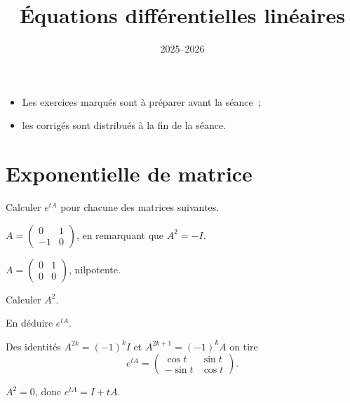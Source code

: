 \documentclass[11pt]{ocots-td}
\title{Équations différentielles linéaires}
\date{2025--2026}
\begin{document}
\maketitle

\begin{instructions}\breakline%
    \begin{itemize}
        \item Les exercices marqués \handwrite{} sont à préparer avant la séance~;
        \item les corrigés sont distribués à la fin de la séance.
    \end{itemize}
\end{instructions}

\medskip
\section{Exponentielle de matrice}


\begin{exercise}[label=ex:expo]
    Calculer $e^{tA}$ pour chacune des matrices suivantes.
    \begin{question}
        $A = \begin{pmatrix} 0 & 1 \\ -1 & 0 \end{pmatrix}$, en remarquant que
        $A^2 = -I$.
    \end{question}
    \begin{question}
        $A = \begin{pmatrix} 0 & 1 \\ 0 & 0 \end{pmatrix}$, nilpotente.
        \begin{subquestion}
            Calculer $A^2$.
        \end{subquestion}
        \begin{subquestion}
            En déduire $e^{tA}$.
        \end{subquestion}
    \end{question}
\solution
    \begin{question}
        Des identités $A^{2k} = (-1)^k I$ et $A^{2k+1} = (-1)^k A$ on tire
        \[
            e^{tA} = \begin{pmatrix} \cos t & \sin t \\ -\sin t & \cos t\end{pmatrix}.
        \]
    \end{question}
    \begin{question}
        $A^2 = 0$, donc $e^{tA} = I + tA$.
    \end{question}
\end{exercise}
\end{document}
